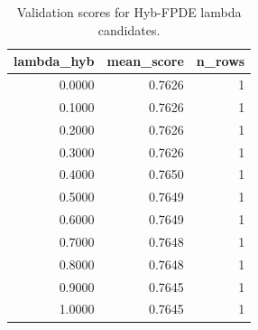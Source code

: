 \begin{table}[t]
\caption{Validation scores for Hyb-FPDE lambda candidates.}
\label{tab:lambda_distribution_computed}
\centering
\begin{tabular}{rrr}
\toprule
lambda\_hyb & mean\_score & n\_rows \\
\midrule
0.0000 & 0.7626 & 1 \\
0.1000 & 0.7626 & 1 \\
0.2000 & 0.7626 & 1 \\
0.3000 & 0.7626 & 1 \\
0.4000 & 0.7650 & 1 \\
0.5000 & 0.7649 & 1 \\
0.6000 & 0.7649 & 1 \\
0.7000 & 0.7648 & 1 \\
0.8000 & 0.7648 & 1 \\
0.9000 & 0.7645 & 1 \\
1.0000 & 0.7645 & 1 \\
\bottomrule
\end{tabular}

\end{table}
